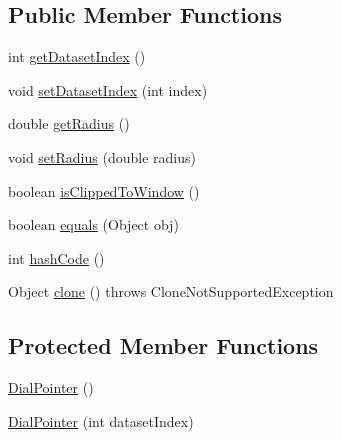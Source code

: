 \subsection*{Public Member Functions}
\begin{DoxyCompactItemize}
\item 
int \mbox{\hyperlink{classorg_1_1jfree_1_1chart_1_1plot_1_1dial_1_1_dial_pointer_afe96b67f23eb74c9230b3bfd04c5eac8}{get\+Dataset\+Index}} ()
\item 
void \mbox{\hyperlink{classorg_1_1jfree_1_1chart_1_1plot_1_1dial_1_1_dial_pointer_af86ef163bf93febe4b323f170ee95a78}{set\+Dataset\+Index}} (int index)
\item 
double \mbox{\hyperlink{classorg_1_1jfree_1_1chart_1_1plot_1_1dial_1_1_dial_pointer_a1119de16d3da4dbef956eb3f8567ddb6}{get\+Radius}} ()
\item 
void \mbox{\hyperlink{classorg_1_1jfree_1_1chart_1_1plot_1_1dial_1_1_dial_pointer_af2f54d1338e0a0c25ba5ba2c32d0452c}{set\+Radius}} (double radius)
\item 
boolean \mbox{\hyperlink{classorg_1_1jfree_1_1chart_1_1plot_1_1dial_1_1_dial_pointer_a4b4c8a88080051d443db95941d01dce1}{is\+Clipped\+To\+Window}} ()
\item 
boolean \mbox{\hyperlink{classorg_1_1jfree_1_1chart_1_1plot_1_1dial_1_1_dial_pointer_a06948d75bb40d404d21cd4695ac3253a}{equals}} (Object obj)
\item 
int \mbox{\hyperlink{classorg_1_1jfree_1_1chart_1_1plot_1_1dial_1_1_dial_pointer_a9c85ef4935d0ae4f43fe7bed6f237044}{hash\+Code}} ()
\item 
Object \mbox{\hyperlink{classorg_1_1jfree_1_1chart_1_1plot_1_1dial_1_1_dial_pointer_a2b5507c1f4ba0861db867becae60f7db}{clone}} ()  throws Clone\+Not\+Supported\+Exception 
\end{DoxyCompactItemize}
\subsection*{Protected Member Functions}
\begin{DoxyCompactItemize}
\item 
\mbox{\hyperlink{classorg_1_1jfree_1_1chart_1_1plot_1_1dial_1_1_dial_pointer_a487d60b7e2f1ed78c693bfff0209171b}{Dial\+Pointer}} ()
\item 
\mbox{\hyperlink{classorg_1_1jfree_1_1chart_1_1plot_1_1dial_1_1_dial_pointer_ac73951e47dd2e51346274ff8afe0c2e3}{Dial\+Pointer}} (int dataset\+Index)
\end{DoxyCompactItemize}


